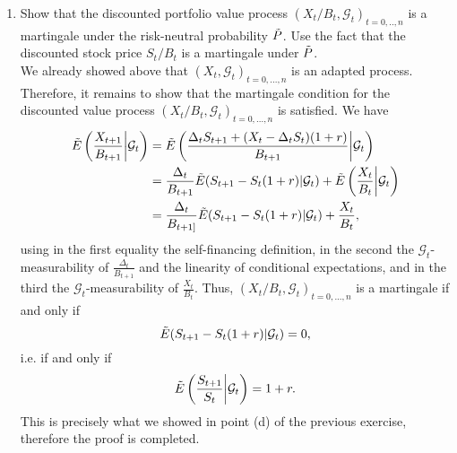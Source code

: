 \documentclass[11pt,a4,table]{article}
\begin{document}
\begin{enumerate}
\begin{enumerate}
        \item Show that the discounted portfolio value process $(X_t/B_t,\mathcal{G}_t)_{t=0,..,n}$ is a martingale under the risk-neutral probability $\Tilde{P}$. Use the fact that the discounted stock price $S_t/B_t$ is a martingale under $\Tilde{P}$.\\
        We already showed above that $(X_t,\mathcal{G}_t)_{t=0,...,n}$ is an adapted process. Therefore, it remains to show that the martingale condition for the discounted value process $(X_t/B_t,\mathcal{G}_t)_{t=0,...,n}$ is satisfied. We have
        \begin{align*}
            \Tilde{E}\left(\frac{X_{t+1}}{B_{t+1}}\bigg\vert\mathcal{G}_t\right) &= \Tilde{E}\left(\frac{\Delta_tS_{t+1}+(X_t-\Delta_tS_t)(1+r)}{B_{t+1}}\bigg\vert \mathcal{G}_t\right)\\
            &= \frac{\Delta_t}{B_{t+1}}\Tilde{E}(S_{t+1}-S_t(1+r)| \mathcal{G}_t)+\Tilde{E}\left(\frac{X_t}{B_t}\bigg\vert \mathcal{G}_t\right)\\
            &= \frac{\Delta_t}{B_{t+1]}}\Tilde{E}(S_{t+1}-S_t(1+r)|\mathcal{G}_t) + \frac{X_t}{B_t},
        \end{align*}
        using in the first equality the self-financing definition, in the second the $\mathcal{G}_t$-measurability of $\frac{\Delta_t}{B_{t+1}}$ and the linearity of conditional expectations, and in the third the $\mathcal{G}_t$-measurability of $\frac{X_t}{B_t}$. Thus, $(X_t/B_t,\mathcal{G}_t)_{t=0,...,n}$ is a martingale if and only if
        \begin{equation*}
            \Tilde{E}(S_{t+1} - S_t(1+r) | \mathcal{G}_t)=0,
        \end{equation*}
        i.e. if and only if
        \begin{equation*}
            \Tilde{E}\left(\frac{S_{t+1}}{S_t}\bigg\vert \mathcal{G}_t\right) = 1+r.
        \end{equation*}
        This is precisely what we showed in point (d) of the previous exercise, therefore the proof is completed.
    \end{enumerate}
    
\end{enumerate}
\end{document}
